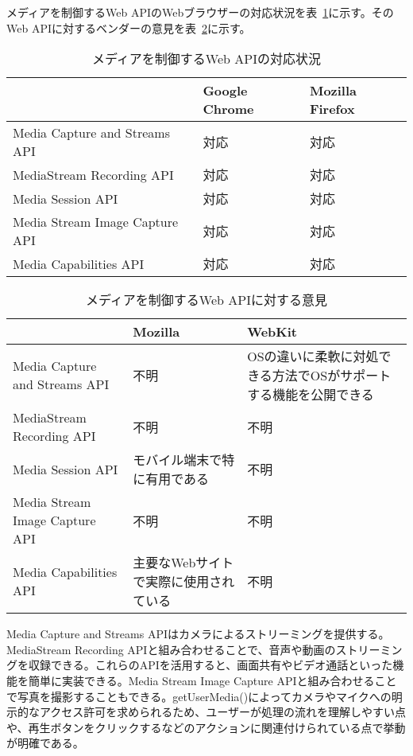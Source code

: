 メディアを制御するWeb APIのWebブラウザーの対応状況を表~\ref{table:メディアを制御するWeb APIの対応状況}に示す。そのWeb APIに対するベンダーの意見を表~\ref{table:メディアを制御するWeb APIに対する意見}に示す。
\begin{table}
  \caption{メディアを制御するWeb APIの対応状況}
  \label{table:メディアを制御するWeb APIの対応状況}
  \centering
  \begin{tabular}{|p{13em}|p{8em}|p{8em}|}
    \hline
    & Google Chrome & Mozilla Firefox \\ \hline
    Media Capture and Streams API & \cellcolor{gray!10}対応 & \cellcolor{gray!10}対応 \\ \hline
    MediaStream Recording API & \cellcolor{gray!10}対応 & \cellcolor{gray!10}対応 \\ \hline
    Media Session API & \cellcolor{gray!10}対応 & \cellcolor{gray!10}対応 \\ \hline
    Media Stream Image Capture API & \cellcolor{gray!10}対応 & \cellcolor{gray!10}対応 \\ \hline
    Media Capabilities API & \cellcolor{gray!10}対応 & \cellcolor{gray!10}対応 \\ \hline
  \end{tabular}
\end{table}
\begin{table}
  \caption{メディアを制御するWeb APIに対する意見}
  \label{table:メディアを制御するWeb APIに対する意見}
    \centering
    \begin{tabular}{|p{13em}|p{13em}|p{13em}|}
        \hline
        & Mozilla & WebKit \\ \hline
        Media Capture and Streams API & 不明 & \cellcolor{gray!10}OSの違いに柔軟に対処できる方法でOSがサポートする機能を公開できる\cite{WebKitMediaCaptureandStreamsAPI} \\ \hline
        MediaStream Recording API & 不明 & 不明 \\ \hline
        Media Session API & \cellcolor{gray!10}モバイル端末で特に有用である~\cite{MozillaMediaSessionAPI} & 不明 \\ \hline
        Media Stream Image Capture API & 不明 & 不明 \\ \hline
        Media Capabilities API & \cellcolor{gray!10}主要なWebサイトで実際に使用されている\cite{MozillaMediaCapabilitiesAPI} & 不明 \\ \hline
    \end{tabular}
\end{table}
Media Capture and Streams APIはカメラによるストリーミングを提供する。MediaStream Recording APIと組み合わせることで、音声や動画のストリーミングを収録できる。これらのAPIを活用すると、画面共有やビデオ通話といった機能を簡単に実装できる。Media Stream Image Capture APIと組み合わせることで写真を撮影することもできる。getUserMedia()によってカメラやマイクへの明示的なアクセス許可を求められるため、ユーザーが処理の流れを理解しやすい点や、再生ボタンをクリックするなどのアクションに関連付けられている点で挙動が明確である。

